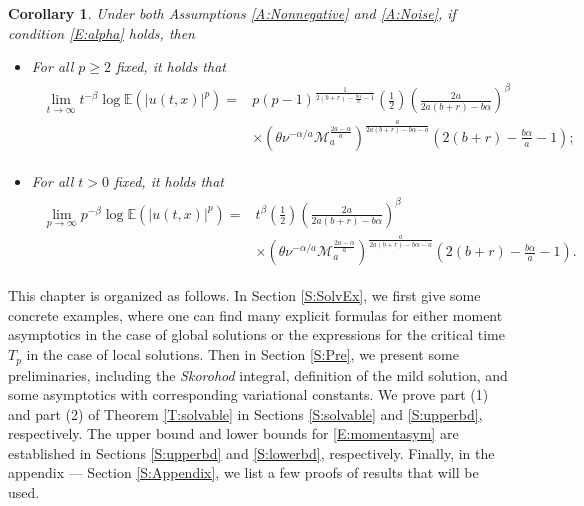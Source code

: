 \documentclass[12pt]{report}
\theoremstyle{plain}
\newtheorem{corollary}[theorem]{Corollary}
\theoremstyle{definition}
\numberwithin{equation}{section}
\newcommand{\E}{\mathbb{E}}
\begin{document}
\begin{corollary} \label{C:Lim}
	Under both Assumptions \ref{A:Nonnegative} and \ref{A:Noise}, if condition \eqref{E:alpha} holds,
	then
	\begin{itemize}
		\item[(1)] For all $p\ge 2$ fixed, it holds that
		\begin{align}
		\label{E:momentasym-t}
		\begin{aligned}
		\lim_{t \to \infty} t^{-\beta} \log \E\left(|u(t,x)|^p\right) =
		& p(p-1)^{\frac{1}{2(b+r)-\frac{b\alpha}{a} -1}} \left(\frac{1}{2}\right)\left(\frac{2a}{2a(b+r)- b\alpha} \right)^\beta \\
		& \times \left(\theta\nu^{-\alpha/a} \mathcal{M}_a^{\frac{2a-\alpha}{a}}\right)^{\frac{a}{2a(b+r)-b\alpha-a}}\left(2(b+r)-\frac{b\alpha}{a}-1\right);
		\end{aligned}
		\end{align}
		\item[(2)] For all $t>0$ fixed, it holds that
		\begin{align}
		\label{E:momentasym-p}
		\begin{aligned}
		\lim_{p \to \infty} p^{-\beta} \log \E\left(|u(t,x)|^p\right) =
		& t^\beta \left(\frac{1}{2}\right)\left(\frac{2a}{2a(b+r)- b\alpha} \right)^\beta \\
		& \times \left(\theta\nu^{-\alpha/a} \mathcal{M}_a^{\frac{2a-\alpha}{a}}\right)^{\frac{a}{2a(b+r)-b\alpha-a}}\left(2(b+r)-\frac{b\alpha}{a}-1\right).
		\end{aligned}
		\end{align}
	\end{itemize}
\end{corollary}

\bigskip

This chapter is organized as follows. In Section \ref{S:SolvEx}, we first give some concrete examples,
where one can find many explicit formulas for either moment asymptotics in the case of global
solutions or the expressions for the critical time $T_p$ in the case of local solutions. Then in
Section \ref{S:Pre}, we present some preliminaries, including the {\it Skorohod}
integral, definition of the mild solution, and some asymptotics with corresponding variational
constants. We prove part (1) and part (2) of Theorem \ref{T:solvable} in Sections \ref{S:solvable}
and \ref{S:upperbd}, respectively.  The upper bound and lower bounds for \eqref{E:momentasym} are
established in Sections \ref{S:upperbd} and \ref{S:lowerbd}, respectively. Finally, in the appendix
--- Section \ref{S:Appendix}, we list a few proofs of results that will be used.
\end{document}
